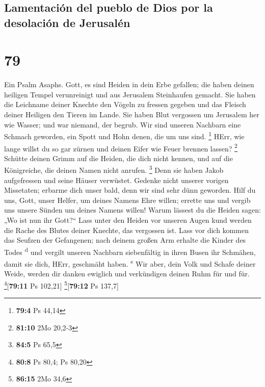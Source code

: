 \hypertarget{lamentaciuxf3n-del-pueblo-de-dios-por-la-desolaciuxf3n-de-jerusaluxe9n}{%
\subsection{Lamentación del pueblo de Dios por la desolación de
Jerusalén}\label{lamentaciuxf3n-del-pueblo-de-dios-por-la-desolaciuxf3n-de-jerusaluxe9n}}

\hypertarget{section-78}{%
\section{79}\label{section-78}}

 Ein Psalm Asaphs. Gott, es sind Heiden in dein Erbe
gefallen; die haben deinen heiligen Tempel verunreinigt und aus
Jerusalem Steinhaufen gemacht.  Sie haben die Leichname
deiner Knechte den Vögeln zu fressen gegeben und das Fleisch deiner
Heiligen den Tieren im Lande.  Sie haben Blut vergossen um
Jerusalem her wie Wasser; und war niemand, der begrub. 
Wir sind unseren Nachbarn eine Schmach geworden, ein Spott und Hohn
denen, die um uns sind. \footnote{\textbf{79:4} Ps 44,14} 
HErr, wie lange willst du so gar zürnen und deinen Eifer wie Feuer
brennen lassen? \footnote{\textbf{81:10} 2Mo 20,2-3} 
Schütte deinen Grimm auf die Heiden, die dich nicht kennen, und auf die
Königreiche, die deinen Namen nicht anrufen. \footnote{\textbf{84:5} Ps
  65,5}  Denn sie haben Jakob aufgefressen und seine
Häuser verwüstet.  Gedenke nicht unserer vorigen
Missetaten; erbarme dich unser bald, denn wir sind sehr dünn geworden.
 Hilf du uns, Gott, unser Helfer, um deines Namens Ehre
willen; errette uns und vergib uns unsere Sünden um deines Namens
willen!  Warum lässest du die Heiden sagen: „Wo ist nun
ihr Gott?{}`` Lass unter den Heiden vor unseren Augen kund werden die
Rache des Blutes deiner Knechte, das vergossen ist.  Lass
vor dich kommen das Seufzen der Gefangenen; nach deinem großen Arm
erhalte die Kinder des Todes \textsuperscript{d}  und
vergilt unseren Nachbarn siebenfältig in ihren Busen ihr Schmähen, damit
sie dich, HErr, geschmäht haben. \textsuperscript{e}  Wir
aber, dein Volk und Schafe deiner Weide, werden dir danken ewiglich und
verkündigen deinen Ruhm für und für. \footnote{\textbf{80:8} Ps 80,4; Ps
  80,20}{[}\textbf{79:11} Ps 102,21{]} \footnote{\textbf{86:15} 2Mo 34,6}{[}\textbf{79:12}
Ps 137,7{]}

